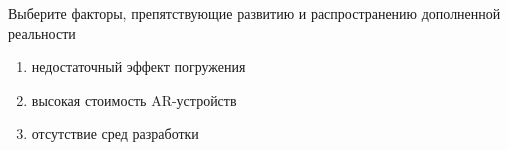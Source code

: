
Выберите факторы, препятствующие развитию и распространению дополненной реальности

\begin{enumerate}
    \item недостаточный эффект погружения
    \item высокая стоимость AR-устройств
    \item отсутствие сред разработки
\end{enumerate}

